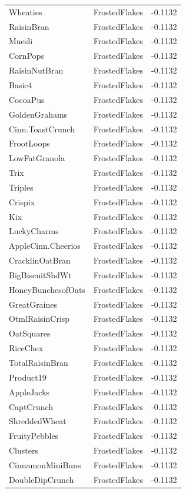 \begin{table}[!htbp]
\begin{tabular}{lll}
Wheaties & FrostedFlakes & -0.1132
\\
RaisinBran & FrostedFlakes & -0.1132
\\
Muesli & FrostedFlakes & -0.1132
\\
CornPops & FrostedFlakes & -0.1132
\\
RaisinNutBran & FrostedFlakes & -0.1132
\\
Basic4 & FrostedFlakes & -0.1132
\\
CocoaPus & FrostedFlakes & -0.1132
\\
GoldenGrahams & FrostedFlakes & -0.1132
\\
Cinn.ToastCrunch & FrostedFlakes & -0.1132
\\
FrootLoops & FrostedFlakes & -0.1132
\\
LowFatGranola & FrostedFlakes & -0.1132
\\
Trix & FrostedFlakes & -0.1132
\\
Triples & FrostedFlakes & -0.1132
\\
Crispix & FrostedFlakes & -0.1132
\\
Kix & FrostedFlakes & -0.1132
\\
LuckyCharms & FrostedFlakes & -0.1132
\\
AppleCinn.Cheerios & FrostedFlakes & -0.1132
\\
CracklinOatBran & FrostedFlakes & -0.1132
\\
BigBiscuitShdWt & FrostedFlakes & -0.1132
\\
HoneyBunchesofOats & FrostedFlakes & -0.1132
\\
GreatGraines & FrostedFlakes & -0.1132
\\
OtmlRaisinCrisp & FrostedFlakes & -0.1132
\\
OatSquares & FrostedFlakes & -0.1132
\\
RiceChex & FrostedFlakes & -0.1132
\\
TotalRaisinBran & FrostedFlakes & -0.1132
\\
Product19 & FrostedFlakes & -0.1132
\\
AppleJacks & FrostedFlakes & -0.1132
\\
CaptCrunch & FrostedFlakes & -0.1132
\\
ShreddedWheat & FrostedFlakes & -0.1132
\\
FruityPebbles & FrostedFlakes & -0.1132
\\
Clusters & FrostedFlakes & -0.1132
\\
CinnamonMiniBuns & FrostedFlakes & -0.1132
\\
DoubleDipCrunch & FrostedFlakes & -0.1132

\end{tabular}
\end{table}

